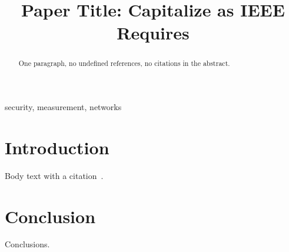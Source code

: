 \documentclass[conference,compsoc]{IEEEtran}
\begin{document}
\title{Paper Title: Capitalize as IEEE Requires}

\author{
}

\maketitle

\begin{abstract}
One paragraph, no undefined references, no citations in the abstract.
\end{abstract}

\begin{IEEEkeywords}
security, measurement, networks
\end{IEEEkeywords}

\section{Introduction}
Body text with a citation~\cite{testref}.

\section{Conclusion}
Conclusions.



\end{document}

